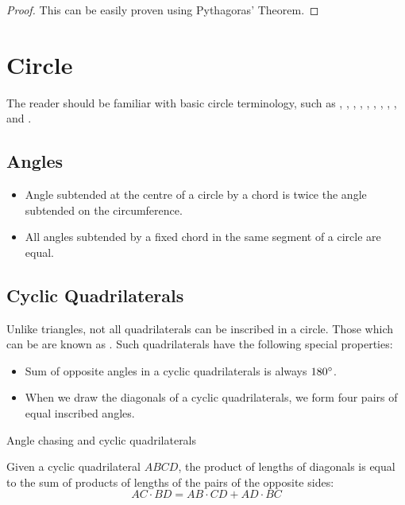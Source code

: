 \begin{proof}
This can be easily proven using Pythagoras' Theorem.
\end{proof}
\pagebreak

\section{Circle}
The reader should be familiar with basic circle terminology, such as , , , , , , , , , and .

\subsection{Angles}
\begin{itemize}
\item Angle subtended at the centre of a circle by a chord is twice the angle subtended on the circumference.
\item All angles subtended by a fixed chord in the same segment of a circle are equal.
\end{itemize}

\subsection{Cyclic Quadrilaterals}
Unlike triangles, not all quadrilaterals can be inscribed in a circle. Those which can be are known as . Such quadrilaterals have the following special properties:
\begin{itemize}
\item Sum of opposite angles in a cyclic quadrilaterals is always $180\degree$.
\item When we draw the diagonals of a cyclic quadrilaterals, we form four pairs of equal inscribed angles.
\end{itemize}


Angle chasing and cyclic quadrilaterals
\begin{theorem}
Given a cyclic quadrilateral $ABCD$, the product of lengths of diagonals is equal to the sum of products of lengths of the pairs of the opposite sides: 
\begin{equation}
AC \cdot BD = AB \cdot CD + AD \cdot BC 
\end{equation} 
\end{theorem}

